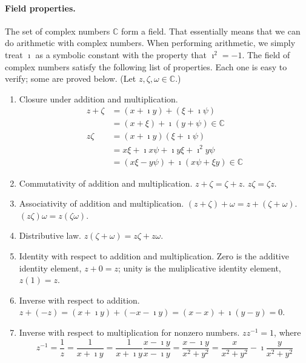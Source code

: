 \paragraph{Field properties.}
The set of complex numbers $\mathbb{C}$ form a field.  That essentially
means that we can do arithmetic with complex numbers.
When performing arithmetic, we simply treat $\imath$ as a symbolic 
constant with the property that $\imath^2 = -1$.
The field of complex numbers satisfy the following list of properties.
Each one is easy to verify; some are proved below.
(Let $z, \zeta, \omega \in \mathbb{C}$.)
\begin{enumerate}
\item
  Closure under addition and multiplication.
  \begin{align*}
    z + \zeta &= \left( x + \imath y \right) + \left(\xi + \imath \psi \right) 
    \\
    &= \left( x + \xi \right) + \imath \left( y + \psi \right) \in \mathbb{C} 
    \\
    z \zeta &= \left( x + \imath y \right) \left( \xi + \imath \psi \right) 
    \\
    &= x \xi + \imath x \psi + \imath y \xi + \imath^2 y \psi
    \\
    &= \left( x \xi - y \psi \right) 
    + \imath \left( x \psi + \xi y \right) \in \mathbb{C}
  \end{align*}
\item
  Commutativity of addition and multiplication.  $z + \zeta = \zeta + z$.
  $z \zeta = \zeta z$.
\item
  Associativity of addition and multiplication.  
  $\left( z + \zeta \right) + \omega = z + \left( \zeta  + \omega \right)$.
  $\left( z \zeta \right) \omega = z \left( \zeta \omega \right)$.
\item
  Distributive law.  $z \left( \zeta + \omega \right) = z \zeta + z \omega$.
\item
  Identity with respect to addition and multiplication.  Zero is the 
  additive identity element, $z + 0 = z$; unity is the muliplicative
  identity element, $z (1) = z$.
\item
  Inverse with respect to addition.
  $z + (-z)= (x + \imath y) + (- x - \imath y) = (x - x) + \imath(y - y) = 0$.
\item
  Inverse with respect to multiplication for nonzero numbers.
  $z z^{-1} = 1$, where 
  \[
  z^{-1} 
  = \frac{1}{z} 
  = \frac{1}{x + \imath y} 
  = \frac{1}{x + \imath y} \frac{x - \imath y}{x - \imath y} 
  = \frac{x - \imath y}{x^2 + y^2}
  = \frac{x}{x^2 + y^2} - \imath \frac{y}{x^2 + y^2}
  \]
\end{enumerate}





